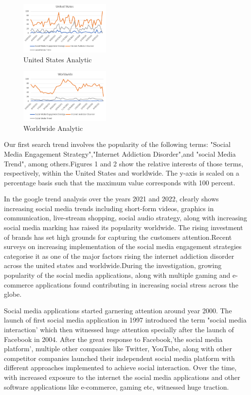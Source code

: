 \documentclass[conference]{IEEEtran}
\begin{document}
\begin{figure}[htbp]
\centerline{\includegraphics[width=0.4\textwidth]{US Graph.PNG}}
\caption{United States Analytic}
\label{fig}
\end{figure}

\begin{figure}[htbp]
\centerline{\includegraphics[width=0.4\textwidth]{Worldwide Analysis Graph.PNG}}
\caption{Worldwide Analytic}
\label{fig}
\end{figure}

Our first search trend involves the popularity of the following terms: "Social Media Engagement Strategy","Internet Addiction Disorder",and "social Media Trend", among others.Figures 1 and 2 show the relative interests of those terms, respectively, within the United States and
worldwide. The y-axis is scaled on a percentage basis such that the maximum value corresponds with 100 percent.

In the google trend analysis over the years 2021 and 2022, clearly shows increasing social media trends including short-form videos, graphics in communication, live-stream shopping, social audio strategy, along with increasing social media marking has raised its popularity worldwide. The rising investment of brands has set high grounds for capturing the customers attention.Recent surveys on increasing implementation of the social media engagement strategies categorise it as one of the major factors rising the internet addiction disorder across the united states and worldwide.During the investigation, growing popularity of the social media applications, along with multiple gaming and e-commerce applications found contributing in increasing social stress across the globe.        

Social media applications started garnering attention around year 2000. The launch of first social media application in 1997 introduced the term "social media interaction' which then witnessed huge attention specially after the launch of Facebook in 2004. After the great response to Facebook,'the social media platform', multiple other companies like Twitter, YouTube, along with other competitor companies launched their independent social media platform with different approaches implemented to achieve social interaction. Over the time, with increased exposure to the internet the social media applications and other software applications like e-commerce, gaming etc, witnessed huge traction. 
\end{document}
